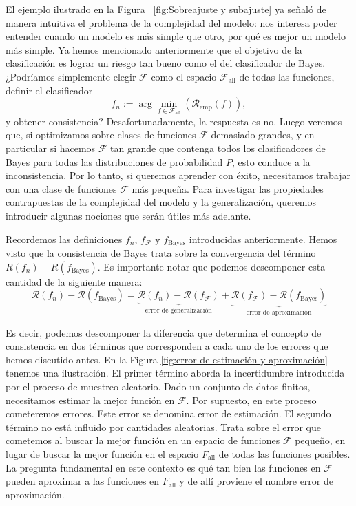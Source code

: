 \documentclass{report}
\begin{document}
El ejemplo ilustrado en la Figura ~\ref{fig:Sobreajuste y subajuste}
ya señaló de manera intuitiva el problema de la complejidad del modelo: nos interesa poder entender cuando un modelo es más simple que otro,
por qué es mejor un modelo más simple.
Ya hemos mencionado anteriormente que el objetivo de la clasificación es lograr un riesgo tan bueno 
como el del clasificador de Bayes. ¿Podríamos simplemente elegir \(\mathcal{F}\) como el espacio \(\mathcal{F}_{\text{all}}\) 
de todas las funciones, definir el clasificador 
$$f_n := \arg\min_{f \in \mathcal{F}_{\text{all}}} \left(\mathcal{R}_{\text{emp}}(f)\right),$$ 
y obtener consistencia? Desafortunadamente, la respuesta es no. Luego veremos que, 
si optimizamos sobre clases de funciones \(\mathcal{F}\) demasiado grandes, y en particular si hacemos \(\mathcal{F}\) tan 
grande que contenga todos los clasificadores de Bayes para todas las distribuciones de probabilidad \(P\), 
esto conduce a la inconsistencia. Por lo tanto, si queremos aprender con éxito, necesitamos trabajar 
con una clase de funciones \(\mathcal{F}\) más pequeña. Para investigar las propiedades contrapuestas de la 
complejidad del modelo y la generalización, queremos introducir algunas nociones que serán útiles más adelante.\newline

Recordemos las definiciones \(f_n\), \(f_\mathcal{F}\) y \(f_{\text{Bayes}}\) introducidas anteriormente. Hemos visto que 
la consistencia de Bayes trata sobre la convergencia del término \(R(f_n) - R(f_{\text{Bayes}})\). 
Es importante notar que podemos descomponer esta cantidad de la siguiente manera:\newline
\[ 
\mathcal{R}(f_n) - \mathcal{R}(f_{\text{Bayes}}) = \underbrace{\mathcal{R}(f_n) - \mathcal{R}(f_\mathcal{F})}_{\text{error de generalización}} +
\underbrace{\mathcal{R}(f_\mathcal{F}) - \mathcal{R}(f_{\text{Bayes}})}_{\text{error de aproximación}} 
\]

Es decir, podemos descomponer la diferencia que determina el concepto de consistencia en dos términos que corresponden a cada uno de los errores que
hemos discutido antes. En la Figura 
\ref{fig:error de estimación y aproximación} 
tenemos una ilustración. El primer término aborda la 
incertidumbre introducida por el proceso de muestreo aleatorio. Dado un conjunto de datos 
finitos, necesitamos estimar la mejor función en \(\mathcal{F}\). Por supuesto, en este proceso cometeremos 
errores. Este error se denomina error de estimación. El segundo término no está influido por cantidades aleatorias.
Trata sobre el error que cometemos al buscar la mejor función en un espacio de funciones \(\mathcal{F}\) pequeño, 
en lugar de buscar la mejor función en el espacio \(F_{\text{all}}\) de todas las funciones posibles. 
La pregunta fundamental en este contexto es qué tan bien las funciones en \(\mathcal{F}\) pueden aproximar a las 
funciones en \(F_{\text{all}}\) y de allí proviene el nombre error de aproximación.\newline
\end{document}
